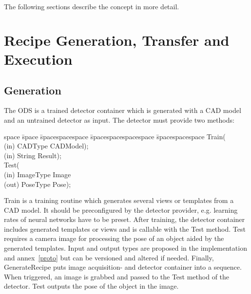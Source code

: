 The following sections describe the concept in more detail.

\section{Recipe Generation, Transfer and Execution}
\subsection{Generation}
    The ODS is a trained detector container which is generated with a CAD model and an untrained detector as input. The detector must provide two methods:
\begin{tabbing}
    space \= space \= spacespacespace \= spacespacespacespace \= spacespacespace \kill
    \>  Train(\\
    \>  \>  (in)	 \> 	CADType          \> CADModel); \\
    \>  \>  (in)	 \> 	String          \> Result); \\
    \>  Test(\\
    \>  \>  (in)	 \> 	ImageType     \> Image\\
    \>  \>  (out)	 \> 	PoseType           \> Pose); 
\end{tabbing}\label{detectormethods}

Train is a training routine which generates several views or templates from a CAD model. It should be preconfigured by the detector provider, e.g. learning rates of neural networks have to be preset. After training, the detector container includes generated templates or views and is callable with the Test method.  Test requires a camera image for processing the pose of an object aided by the generated templates.  Input and output types are proposed in the implementation and annex~\ref{proto} but can be versioned and altered if needed. Finally, GenerateRecipe puts image acquisition- and detector container into a sequence. When triggered, an image is grabbed and passed to the Test method of the detector. Test outputs the pose of the object in the image.

